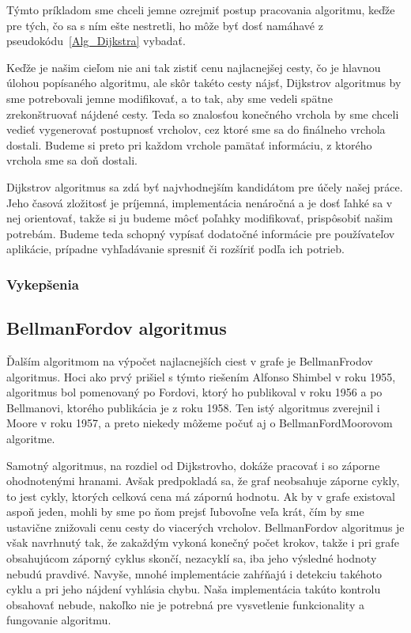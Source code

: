 Týmto príkladom sme chceli jemne ozrejmiť postup pracovania algoritmu, keďže pre tých, čo sa s ním ešte nestretli, ho môže byť dosť namáhavé z pseudokódu~\ref{Alg_Dijkstra} vybadať.\newline

Keďže je našim cieľom nie ani tak zistiť cenu najlacnejšej cesty, čo je hlavnou úlohou popísaného algoritmu, ale skôr takéto cesty nájsť, Dijkstrov algoritmus by sme potrebovali jemne modifikovať, a to tak, aby sme vedeli spätne zrekonštruovať nájdené cesty. Teda so znalosťou konečného vrchola by sme chceli vedieť vygenerovať postupnosť vrcholov, cez ktoré sme sa do finálneho vrchola dostali. Budeme si preto pri každom vrchole pamätať informáciu, z ktorého vrchola sme sa doň dostali.\newline

Dijkstrov algoritmus sa zdá byť najvhodnejším kandidátom pre účely našej práce. Jeho časová zložitosť je príjemná, implementácia nenáročná a je dosť ľahké sa v nej orientovať, takže si ju budeme môcť poľahky modifikovať, prispôsobiť našim potrebám. Budeme teda schopný vypísať dodatočné informácie pre používateľov aplikácie, prípadne vyhľadávanie spresniť či rozšíriť podľa ich potrieb.\newline

\subsubsection{Vykepšenia}





\subsection{Bellman\textendash Fordov algoritmus}

Ďalším algoritmom na výpočet najlacnejších ciest v grafe je Bellman\textendash Frodov algoritmus. Hoci ako prvý prišiel s týmto riešením Alfonso Shimbel v roku 1955, algoritmus bol pomenovaný po Fordovi, ktorý ho publikoval v roku 1956 a po Bellmanovi, ktorého publikácia je z roku 1958. Ten istý algoritmus zverejnil i Moore v roku 1957, a preto niekedy môžeme počuť aj o Bellman\textendash Ford\textendash Moorovom algoritme.\newline

Samotný algoritmus, na rozdiel od Dijkstrovho, dokáže pracovať i so záporne ohodnotenými hranami. Avšak predpokladá sa, že graf neobsahuje záporne cykly, to jest cykly, ktorých celková cena má zápornú hodnotu. Ak by v grafe existoval aspoň jeden, mohli by sme po ňom prejsť ľubovoľne veľa krát, čím by sme ustavične znižovali cenu cesty do viacerých vrcholov. Bellman\textendash Fordov algoritmus je však navrhnutý tak, že zakaždým vykoná konečný počet krokov, takže i pri grafe obsahujúcom záporný cyklus skončí, nezacyklí sa, iba jeho výsledné hodnoty nebudú pravdivé. Navyše, mnohé implementácie zahŕňajú i detekciu takéhoto cyklu a pri jeho nájdení vyhlásia chybu. Naša implementácia takúto kontrolu obsahovať nebude, nakoľko nie je potrebná pre vysvetlenie funkcionality a fungovanie algoritmu.\newline

